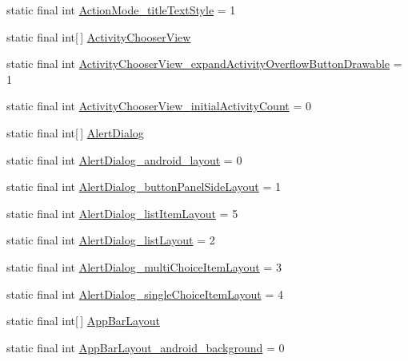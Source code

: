 \begin{DoxyCompactItemize}
\item 
static final int \hyperlink{classcheck_1_1test_1_1_r_1_1styleable_a16a980c21195919de6d38329e1f52a7a}{Action\+Mode\+\_\+title\+Text\+Style} = 1
\item 
static final int\mbox{[}$\,$\mbox{]} \hyperlink{classcheck_1_1test_1_1_r_1_1styleable_af1c3794ed9efe3a08ba4e2366f7961d3}{Activity\+Chooser\+View}
\item 
static final int \hyperlink{classcheck_1_1test_1_1_r_1_1styleable_a174d1b81e0921eb75bc24ddc8ac899f3}{Activity\+Chooser\+View\+\_\+expand\+Activity\+Overflow\+Button\+Drawable} = 1
\item 
static final int \hyperlink{classcheck_1_1test_1_1_r_1_1styleable_a121ad1bfa72c91eb832d3f651be3caf8}{Activity\+Chooser\+View\+\_\+initial\+Activity\+Count} = 0
\item 
static final int\mbox{[}$\,$\mbox{]} \hyperlink{classcheck_1_1test_1_1_r_1_1styleable_a1d9c160813dfdd546911e783935ebb65}{Alert\+Dialog}
\item 
static final int \hyperlink{classcheck_1_1test_1_1_r_1_1styleable_a3c776b8dc9750dc9868d3e65d915a53d}{Alert\+Dialog\+\_\+android\+\_\+layout} = 0
\item 
static final int \hyperlink{classcheck_1_1test_1_1_r_1_1styleable_a929e9b246cebde3d26e0df79ede0734d}{Alert\+Dialog\+\_\+button\+Panel\+Side\+Layout} = 1
\item 
static final int \hyperlink{classcheck_1_1test_1_1_r_1_1styleable_af8626e86eefaa84c9e393dc383c34a06}{Alert\+Dialog\+\_\+list\+Item\+Layout} = 5
\item 
static final int \hyperlink{classcheck_1_1test_1_1_r_1_1styleable_ae130e7610181925120d23e9b40d846c5}{Alert\+Dialog\+\_\+list\+Layout} = 2
\item 
static final int \hyperlink{classcheck_1_1test_1_1_r_1_1styleable_ae3a136130119ae9ebf31f7eb82968d0d}{Alert\+Dialog\+\_\+multi\+Choice\+Item\+Layout} = 3
\item 
static final int \hyperlink{classcheck_1_1test_1_1_r_1_1styleable_a6be8c6aa13def4b95a7fa4ed71c5bda9}{Alert\+Dialog\+\_\+single\+Choice\+Item\+Layout} = 4
\item 
static final int\mbox{[}$\,$\mbox{]} \hyperlink{classcheck_1_1test_1_1_r_1_1styleable_ac38bda3bc57af07b7730c8f4a05b2049}{App\+Bar\+Layout}
\item 
static final int \hyperlink{classcheck_1_1test_1_1_r_1_1styleable_a74c1c6d08d529edbb508f5d37e4e292e}{App\+Bar\+Layout\+\_\+android\+\_\+background} = 0
\item 

\end{DoxyCompactItemize}
